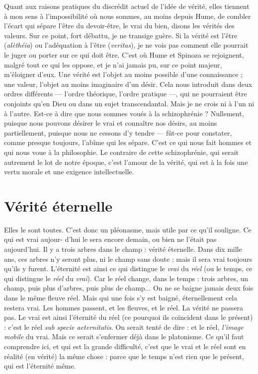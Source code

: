 Quant aux raisons pratiques du discrédit actuel de l’idée de vérité, elles
tiennent à mon sens à l'impossibilité où nous sommes, au moins depuis Hume,
de combler l'écart qui sépare l’être du devoir-être, le vrai du bien, disons les
vérités des valeurs. Sur ce point, fort débattu, je ne transige guère. Si la vérité
est l’être ({\it alèthéia}) ou l'adéquation à l’être ({\it veritas}), je ne vois pas comment elle
pourrait le juger ou porter sur ce qui doit être. C’est où Hume et Spinoza se
rejoignent, malgré tout ce qui les oppose, et je n’ai jamais pu, sur ce point
majeur, m’éloigner d’eux. Une vérité est l’objet au moins possible d’une
connaissance ; une valeur, l’objet au moins imaginaire d’un désir. Cela nous
introduit dans deux ordres différents — l’ordre théorique, l’ordre pratique —, qui
ne pourraient être conjoints qu’en Dieu ou dans un sujet transcendantal. Mais
je ne crois ni à l’un ni à l’autre. Est-ce à dire que nous sommes voués à la
schizophrénie ? Nullement, puisque nous pouvons désirer le vrai et connaître
nos désirs, au moins partiellement, puisque nous ne cessons d’y tendre — fût-ce
pour constater, comme presque toujours, l’abîme qui les sépare. C’est ce qui
nous fait hommes et qui nous voue à la philosophie. Le contraire de cette schizophrénie,
qui serait autrement le lot de notre époque, c’est l'amour de la
vérité, qui est à la fois une vertu morale et une exigence intellectuelle.

\section{Vérité éternelle}
Elles le sont toutes. C’est donc un pléonasme, mais
utile par ce qu’il souligne. Ce qui est vrai aujour-
d’hui le sera encore demain, ou bien ne l'était pas aujourd’hui. Il y a trois arbres
dans le champ : vérité éternelle. Dans dix mille ans, ces arbres n’y seront plus,
ni le champ sans doute ; mais il sera vrai toujours qu’ils y furent. L’éternité est
ainsi ce qui distingue le {\it vrai} du {\it réel} (ou le temps, ce qui distingue le {\it réel} du
{\it vrai}). Car le réel change, dans le temps : trois arbres, un champ, puis plus
d'arbres, puis plus de champ... On ne se baigne jamais deux fois dans le même
fleuve réel. Mais qui une fois s’y est baigné, éternellement cela restera vrai. Les
hommes passent, et les fleuves, et le réel. La vérité ne passera pas. Le vrai est
ainsi l'éternité du réel (ce pourquoi ils coïncident dans le présent) : c’est le réel
{\it sub specie aeternitatis}. On serait tenté de dire : et le réel, {\it l'image mobile} du vrai.
Mais ce serait s’enfermer déjà dans le platonisme. Ce qu’il faut comprendre ici,
et qui est la grande difficulté, c’est que le vrai et le réel sont en réalité (en vérité)
la même chose : parce que le temps n’est rien que le présent, qui est l'éternité
même.


